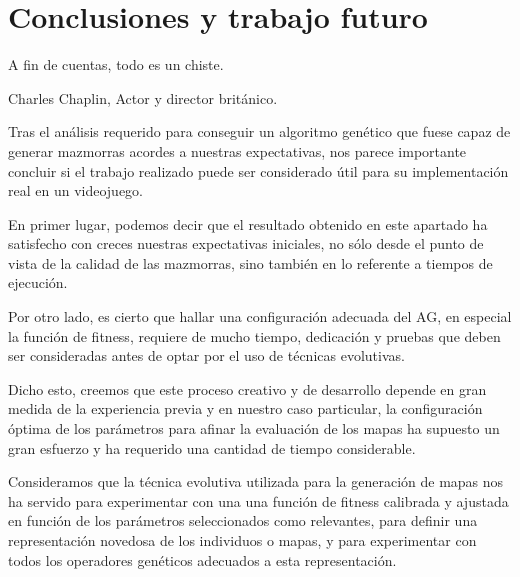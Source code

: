 %
%

\chapter{Conclusiones y trabajo futuro}
\begin{FraseCelebre}
\begin{Frase}
A fin de cuentas, todo es un chiste.
\end{Frase}
\begin{Fuente}
Charles Chaplin, Actor y director brit\'anico.
\end{Fuente}
\end{FraseCelebre}


Tras el an\'alisis requerido para conseguir un algoritmo gen\'etico que fuese capaz de generar mazmorras acordes a nuestras expectativas, nos parece importante concluir si el trabajo realizado puede ser considerado \'util para su implementaci\'on real en un videojuego.\par
En primer lugar, podemos decir que el resultado obtenido en este apartado ha satisfecho con creces nuestras expectativas iniciales, no s\'olo desde el punto de vista de la calidad de las mazmorras, sino tambi\'en en lo referente a tiempos de ejecuci\'on.\par
Por otro lado, es cierto que hallar una configuraci\'on adecuada del AG, en especial la funci\'on de fitness, requiere de mucho tiempo, dedicaci\'on y pruebas que deben ser consideradas antes de optar por el uso de t\'ecnicas evolutivas.\par
Dicho esto, creemos que este proceso creativo y de desarrollo depende en gran medida de la experiencia previa y en nuestro caso particular, la configuraci\'on \'optima de los par\'ametros para afinar la evaluaci\'on de los mapas ha supuesto un gran esfuerzo y ha requerido una cantidad de tiempo considerable.\par
Consideramos que la t\'ecnica evolutiva utilizada para la generaci\'on de mapas nos ha servido para experimentar con una una funci\'on de fitness calibrada y ajustada en funci\'on de los par\'ametros seleccionados como relevantes, para definir una representaci\'on novedosa de los individuos o mapas, y para experimentar con todos los operadores gen\'eticos adecuados a esta representaci\'on.\par

